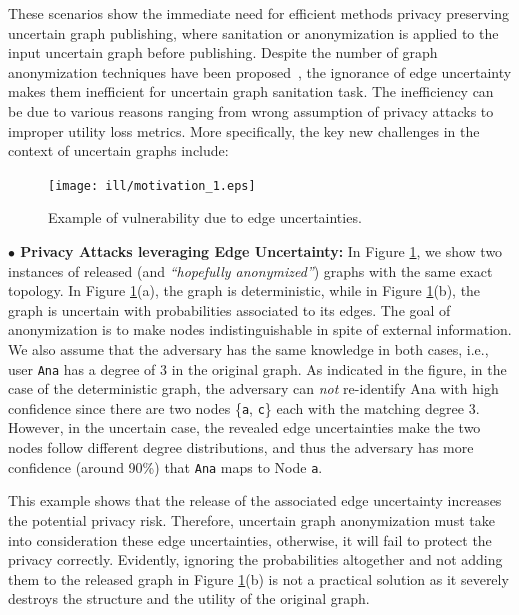 \vspace{2mm}
These scenarios show the immediate need for efficient methods privacy preserving uncertain graph publishing, where sanitation or anonymization is applied to the input uncertain graph before publishing. Despite the number of graph anonymization techniques have been proposed~\cite{Liu_Towards_2008, Boldi_Injecting_2012,  Mittal_Preserving_2013, Nguyen_Anonymizing_2015, Liu_Privacy_2009, Ying_Randomizing_2008, Ninggal_Utility_2015,  Bonchi_Identity_2014}, the ignorance of edge uncertainty makes them inefficient for uncertain graph sanitation task. The inefficiency can be due to various reasons ranging from wrong assumption of privacy attacks to improper utility loss metrics. More specifically, the key new challenges in the context of uncertain graphs include:


\begin{figure}
	\centering
    \texttt{[image: ill/motivation\_1.eps]}
    \vspace{-15pt}
    \caption{Example of vulnerability due to edge uncertainties.}
    \label{fig:motivation}
    \vspace{-25pt}
\end{figure}

\vspace{2mm}\hspace{-1em}
\textbf{$\bullet$ Privacy Attacks leveraging Edge Uncertainty:} 
In Figure \ref{fig:motivation}, we show two instances of released (and {\em ``hopefully anonymized''}) graphs with the same exact topology. 
In Figure \ref{fig:motivation}(a), the graph is deterministic, while in Figure \ref{fig:motivation}(b), the graph is uncertain with probabilities associated to its edges. 
The goal of anonymization is to make nodes indistinguishable in spite of external information. 
We also assume that the adversary has the same knowledge in both cases, i.e., user {\tt Ana} has a degree of $3$ in the original graph. 
As indicated in the figure, in the case of the deterministic graph, 
the adversary can \emph{not} re-identify Ana with high confidence since there are two nodes \{{\tt a}, {\tt c}\} each with the matching degree $3$. 
However, in the uncertain case, the revealed edge uncertainties make the two nodes follow different degree distributions, and thus  
the adversary has more confidence (around 90\%) that {\tt Ana} maps to Node {\tt a}. 

This example shows that the release of the associated edge uncertainty increases the potential privacy risk. 
Therefore, uncertain graph anonymization must take into consideration these edge uncertainties, otherwise, it will fail to protect the privacy correctly.  
Evidently, ignoring the probabilities altogether and not adding them to the released graph in Figure \ref{fig:motivation}(b) is not a practical solution as it 
severely destroys  the structure and the utility of the original graph. 


